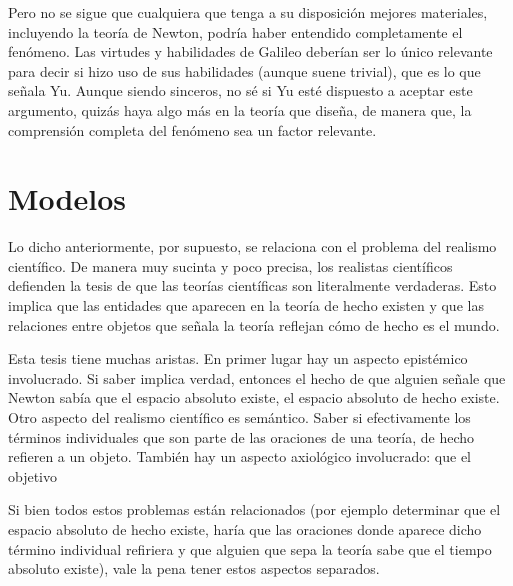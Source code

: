 Pero no se sigue que cualquiera que tenga a su disposición mejores materiales, incluyendo la teoría de Newton, podría haber entendido completamente el fenómeno. Las virtudes y habilidades de Galileo deberían ser lo único relevante para decir si hizo uso de sus habilidades (aunque suene trivial), que es lo que señala Yu. Aunque siendo sinceros, no sé si Yu esté dispuesto a aceptar este argumento, quizás haya algo más en la teoría que diseña, de manera que, la comprensión completa del fenómeno sea un factor relevante.


\section{Modelos}

Lo dicho anteriormente, por supuesto, se relaciona con el problema del realismo científico. De manera muy sucinta y poco precisa, los realistas científicos defienden la tesis de que las teorías científicas son literalmente verdaderas. Esto implica que las entidades que aparecen en la teoría de hecho existen y que las relaciones entre objetos que señala la teoría reflejan cómo de hecho es el mundo.

Esta tesis tiene muchas aristas. En primer lugar hay un aspecto epistémico involucrado. Si saber implica verdad, entonces el hecho de que alguien señale que Newton sabía que el espacio absoluto existe, el espacio absoluto de hecho existe. Otro aspecto del realismo científico es semántico. Saber si efectivamente los términos individuales que son parte de las oraciones de una teoría, de hecho refieren a un objeto. También hay un aspecto axiológico involucrado: que el objetivo %

Si bien todos estos problemas están relacionados (por ejemplo determinar que el espacio absoluto de hecho existe, haría que las oraciones donde aparece dicho término individual refiriera y que alguien que sepa la teoría sabe que el tiempo absoluto existe), vale la pena tener estos aspectos separados.

